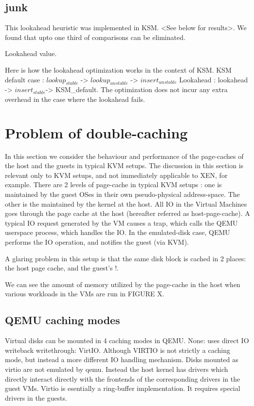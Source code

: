 \documentclass[10pt,a4paper]{article}
\begin{document}
\subsection {junk}
This lookahead heuristic was implemented in KSM. <See below for results>. 
We found that upto one third of comparisons can be eliminated.

Lookahead value.

Here is how the lookahead optimization works in the context of KSM. 
KSM default case : $lookup_{stable}$ -> $lookup_{unstable}$ -> $insert_{unstable}$
Lookahead : lookahead -> $insert_{stable}$-> KSM_default.
The optimization does not incur any extra overhead in the case where the lookahead fails.



\section{Problem of double-caching}
In this section we consider the behaviour and performance of the page-caches of the host and the guests in typical KVM setups. The discussion in this section is relevant only to KVM setups, and not immediately applicable to XEN, for example.
There are 2 levels of page-cache in typical KVM setups : one is maintained by the guest OSes in their own pseudo-physical address-space. The other is the maintained by the kernel at the host. 
All IO in the Virtual Machines goes through the page cache at the host (hereafter referred as host-page-cache). A typical IO request generated by the VM causes a trap, which calls the QEMU userspace process, which handles the IO. In the emulated-disk case, QEMU performs the IO operation, and notifies the guest (via KVM). 

A glaring problem in this setup is that the same disk block is cached in 2 places: the host page cache, and the guest's !.

We can see the amount of memory utilized by the page-cache in the host when various workloads in the VMs are run in FIGURE X.

\subsection {QEMU caching modes}
Virtual disks can be mounted in 4 caching modes in QEMU.
None: uses direct IO
writeback
writethrough:
VirtIO. Although VIRTIO is not strictly a caching mode, but instead a more different IO handling mechanism. Disks mounted as virtio are not emulated by qemu. Instead the host kernel has drivers which directly interact directly with the frontends of the corresponding drivers in the guest VMs.
Virtio is esentially a ring-buffer implementation. It requires special drivers in the guests. 
\end{document}
